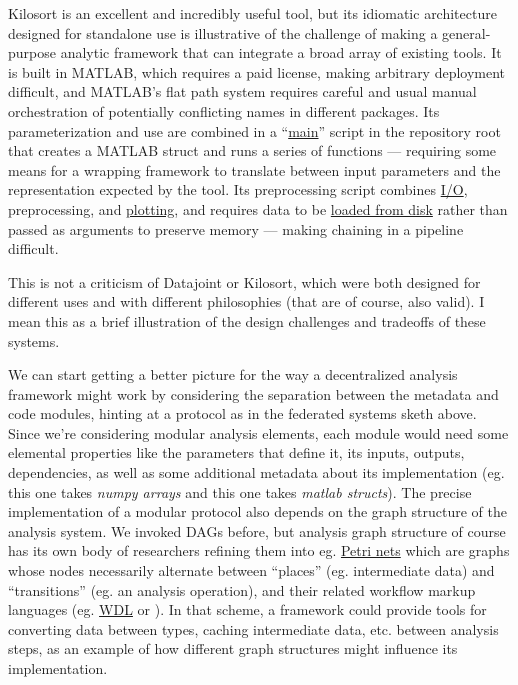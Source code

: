 \documentclass[notoc]{tufte-book}
\begin{document}
Kilosort is an excellent and incredibly useful tool, but its idiomatic
architecture designed for standalone use is illustrative of the
challenge of making a general-purpose analytic framework that can
integrate a broad array of existing tools. It is built in MATLAB, which
requires a paid license, making arbitrary deployment difficult, and
MATLAB's flat path system requires careful and usual manual
orchestration of potentially conflicting names in different packages.
Its parameterization and use are combined in a
``\href{https://github.com/MouseLand/Kilosort/blob/db3a3353d9a374ea2f71674bbe443be21986c82c/main_kilosort3.m}{main}''
script in the repository root that creates a MATLAB struct and runs a
series of functions --- requiring some means for a wrapping framework to
translate between input parameters and the representation expected by
the tool. Its preprocessing script combines
\href{https://github.com/MouseLand/Kilosort/blob/a1fccd9abf13ce5dc3340fae8050f9b1d0f8ab7a/preProcess/datashift.m\#L74-L77}{I/O},
preprocessing, and
\href{https://github.com/MouseLand/Kilosort/blob/a1fccd9abf13ce5dc3340fae8050f9b1d0f8ab7a/preProcess/datashift.m\#L57-L68}{plotting},
and requires data to be
\href{https://github.com/MouseLand/Kilosort/blob/a1fccd9abf13ce5dc3340fae8050f9b1d0f8ab7a/preProcess/preprocessDataSub.m\#L82-L84}{loaded
from disk} rather than passed as arguments to preserve memory --- making
chaining in a pipeline difficult.

This is not a criticism of Datajoint or Kilosort, which were both
designed for different uses and with different philosophies (that are of
course, also valid). I mean this as a brief illustration of the design
challenges and tradeoffs of these systems.

We can start getting a better picture for the way a decentralized
analysis framework might work by considering the separation between the
metadata and code modules, hinting at a protocol as in the federated
systems sketh above. Since we're considering modular analysis elements,
each module would need some elemental properties like the parameters
that define it, its inputs, outputs, dependencies, as well as some
additional metadata about its implementation (eg. this one takes
\emph{numpy arrays} and this one takes \emph{matlab structs}). The
precise implementation of a modular protocol also depends on the graph
structure of the analysis system. We invoked DAGs before, but analysis
graph structure of course has its own body of researchers refining them
into eg. \href{https://en.wikipedia.org/wiki/Petri_net}{Petri nets}
which are graphs whose nodes necessarily alternate between ``places''
(eg. intermediate data) and ``transitions'' (eg. an analysis operation),
and their related workflow markup languages (eg.
\href{https://openwdl.org/}{WDL} or \citep{vanderaalstYAWLAnotherWorkflow2005} ). In that scheme, a framework
could provide tools for converting data between types, caching
intermediate data, etc. between analysis steps, as an example of how
different graph structures might influence its implementation.
\end{document}
